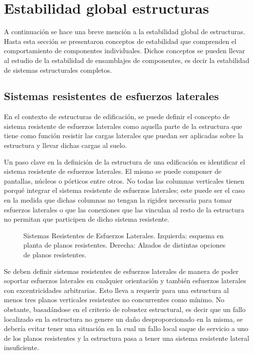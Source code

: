 \section{Estabilidad global estructuras}
A continuación se hace una breve mención a la estabilidad global de estructuras. Hasta esta sección se presentaron conceptos de estabilidad que comprenden el comportamiento de componentes individuales. Dichos conceptos se pueden llevar al estudio de la estabilidad de ensamblajes de componentes, es decir la estabilidad de sistemas estructurales completos.

\subsection{Sistemas resistentes de esfuerzos laterales}
En el contexto de estructuras de edificación, se puede definir el concepto de sistema resistente de esfuerzos laterales como aquella parte de la estructura que tiene como función resistir las cargas laterales que puedan ser aplicadas sobre la estructura y llevar dichas cargas al suelo.

Un paso clave en la definición de la estructura de una edificación es identificar el sistema resistente de esfuerzos laterales. El mismo se puede componer de pantallas, núcleos o pórticos entre otros. No todas las columnas verticales tienen porqué integrar el sistema resistente de esfuerzos laterales; este puede ser el caso en la medida que dichas columnas no tengan la rigidez necesaria para tomar esfuerzos laterales o que las conexiones que las vinculan al resto de la estructura no permitan que participen de dicho sistema resistente.

\begin{figure}[htb]
  \centering
	\caption{Sistemas Resistentes de Esfuerzos Laterales. Izquierda: esquema en planta de planos resistentes. Derecha: Alzados de distintas opciones de planos resistentes.}
	\label{fig:EsqNucleos}
\end{figure}

Se deben definir sistemas resistentes de esfuerzos laterales de manera de poder soportar esfuerzos laterales en cualquier orientación y también esfuerzos laterales con excentricidades arbitrarias. Esto lleva a requerir para una estructura al menos tres planos verticales resistentes no concurrentes como mínimo. No obstante, basadándose en el criterio de robustez estructural, es decir que un fallo localizado en la estructura no genere un daño desproporcionado en la misma, se debería evitar tener una situación en la cual un fallo local saque de servicio a uno de los planos resistentes y la estructura pasa a tener una sistema resistente lateral insuficiente.


